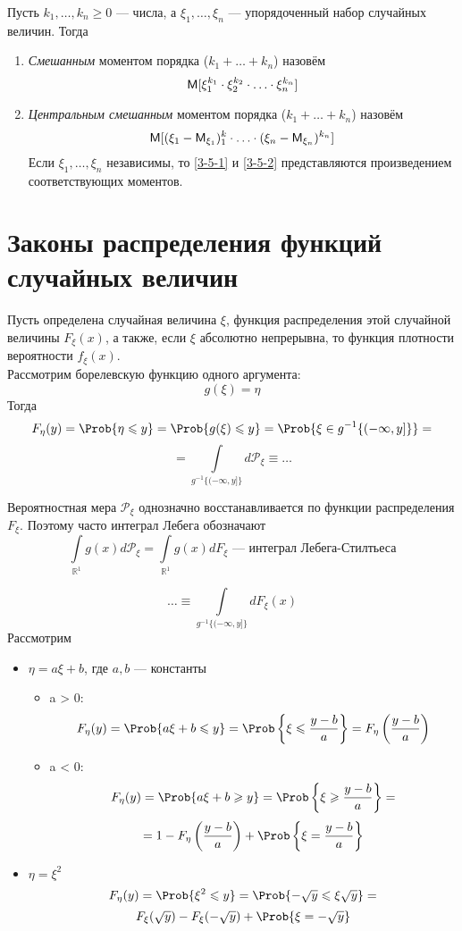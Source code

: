 \begin{definition}
  Пусть $k_1, \ldots, k_n \geqslant 0$ --- числа, а $\xi_1, \ldots, \xi_n$ --- упорядоченный набор случайных величин. Тогда
  \begin{enumerate}
    \item \label{3-5-1} \textit{Смешанным} моментом порядка ($k_1 + \ldots + k_n$) назовём
    \[
      \mathsf{M} [\xi_1^{k_1} \cdot \xi_2^{k_2} \cdot \ldots \cdot \xi_n^{k_n}]
    \]
    \item \label{3-5-2} \textit{Центральным смешанным} моментом порядка ($k_1 + \ldots + k_n$) назовём
    \[
      \mathsf{M} [(\xi_1 - \mathsf{M}_{\xi_1})^k_1 \cdot \ldots \cdot (\xi_n - \mathsf{M}_{\xi_n})^{k_n}]
    \]
    Если $\xi_1, \ldots, \xi_n$ независимы, то \ref{3-5-1} и \ref{3-5-2} представляются произведением соответствующих моментов.
  \end{enumerate}
\end{definition}

\section{Законы распределения функций случайных величин}
Пусть определена случайная величина $\xi$, функция распределения этой случайной величины $F_{\xi}(x)$, а также, если $\xi$ абсолютно непрерывна, то функция плотности вероятности $f_{\xi}(x)$. \\
Рассмотрим борелевскую функцию одного аргумента:
\[
  g(\xi) = \eta
\]
Тогда
\[
  F_{\eta} (y) = \Prob \{ \eta \leqslant y \} = \Prob \{ g(\xi) \leqslant y \} = \Prob \{ \xi \in g^{-1} \{ (-\infty, y] \} \} =
\]
\[
  = \int\limits_{g^{-1} \{ (-\infty, y] \}} d \mathcal{P}_{\xi} \equiv \ldots
\]
\begin{addition}
  Вероятностная мера $\mathcal{P}_{\xi}$ однозначно восстанавливается по функции распределения $F_{\xi}$. Поэтому часто интеграл Лебега обозначают
  \[
    \int\limits_{\mathbb{R}^1} g(x) d \mathcal{P}_{\xi} = \int\limits_{\mathbb{R}^1} g(x) dF_{\xi} \text{ --- интеграл Лебега-Стилтьеса}
  \]
\end{addition}
\[
 \ldots \equiv \int\limits_{g^{-1} \{ (-\infty, y] \}} d F_{\xi} (x)
\]
Рассмотрим
\begin{itemize}
  \item $\eta = a \xi + b$, где $a, b$ --- константы
  \begin{itemize}
    \item a > 0:
    \[
      F_{\eta} (y) = \Prob \{a \xi + b \leqslant y \} = \Prob \left\{ \xi \leqslant \frac{y-b}{a} \right\} = F_{\eta} \left( \frac{y-b}{a} \right)
    \]
    \item a < 0:
    \[
      F_{\eta} (y) = \Prob \{a \xi + b \geqslant y \} = \Prob \left\{ \xi \geqslant \frac{y-b}{a} \right\} =
    \]
    \[
      = 1 - F_{\eta} \left( \frac{y-b}{a}\right) + \Prob \left\{ \xi = \frac{y-b}{a} \right\}
    \]
  \end{itemize}
  \item $\eta = \xi^2$
	\[
		F_{\eta}(y) =  \Prob \{\xi^2 \leqslant y \} = \Prob \{ -\sqrt{y} \leqslant \xi \sqrt{y} \} =
	\]
	\[
		F_{\xi}(\sqrt{y})  - F_{\xi} (-\sqrt{ y }) + \Prob \{ \xi = -\sqrt{y} \}
	\]
\end{itemize}

